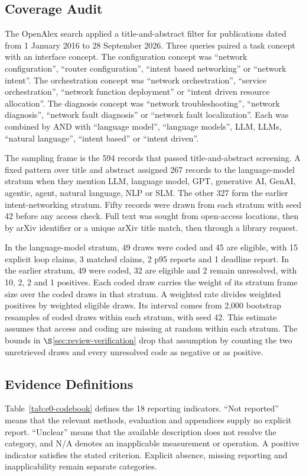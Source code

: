 \subsection{Coverage Audit}\label{app:coverage-audit}
The OpenAlex search applied a title-and-abstract filter for publications dated from 1 January 2016 to 28 September 2026. Three queries paired a task concept with an interface concept. The configuration concept was ``network configuration'', ``router configuration'', ``intent based networking'' or ``network intent''. The orchestration concept was ``network orchestration'', ``service orchestration'', ``network function deployment'' or ``intent driven resource allocation''. The diagnosis concept was ``network troubleshooting'', ``network diagnosis'', ``network fault diagnosis'' or ``network fault localization''. Each was combined by AND with ``language model'', ``language models'', LLM, LLMs, ``natural language'', ``intent based'' or ``intent driven''.

The sampling frame is the 594 records that passed title-and-abstract screening. A fixed pattern over title and abstract assigned 267 records to the language-model stratum when they mention LLM, language model, GPT, generative AI, GenAI, agentic, agent, natural language, NLP or SLM. The other 327 form the earlier intent-networking stratum. Fifty records were drawn from each stratum with seed 42 before any access check. Full text was sought from open-access locations, then by arXiv identifier or a unique arXiv title match, then through a library request.

In the language-model stratum, 49 draws were coded and 45 are eligible, with 15 explicit loop claims, 3 matched claims, 2 p95 reports and 1 deadline report. In the earlier stratum, 49 were coded, 32 are eligible and 2 remain unresolved, with 10, 2, 2 and 1 positives. Each coded draw carries the weight of its stratum frame size over the coded draws in that stratum. A weighted rate divides weighted positives by weighted eligible draws. Its interval comes from 2,000 bootstrap resamples of coded draws within each stratum, with seed 42. This estimate assumes that access and coding are missing at random within each stratum. The bounds in $\S$\ref{sec:review-verification} drop that assumption by counting the two unretrieved draws and every unresolved code as negative or as positive.

\subsection{Evidence Definitions}
Table~\ref{tab:e0-codebook} defines the 18 reporting indicators. ``Not reported'' means that the relevant methods, evaluation and appendices supply no explicit report. ``Unclear'' means that the available description does not resolve the category, and N/A denotes an inapplicable measurement or operation. A positive indicator satisfies the stated criterion. Explicit absence, missing reporting and inapplicability remain separate categories.

